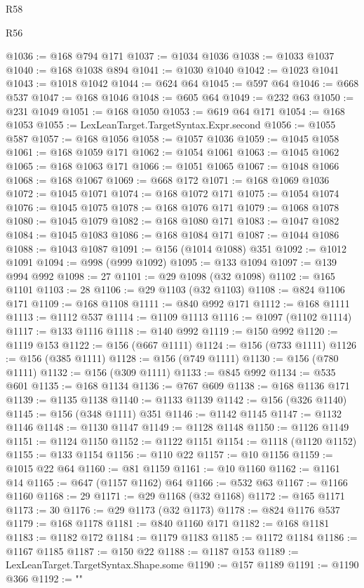 \begin{lexlean}{R58}
\begin{lexlean}{R56}
\begin{coremodule}
{{{{{{{{{{{{{{{{{{{{{{{{{{{{{{{{{{{{{{{{{{{{{{{{{{{{{{{{{{{{{{{{{{{{{{{{{{{{{{{{{{{{{{{{{{{{{{{{{{{{{{{{{{{{{{{{{{{{{{{{{{{{{{{{{{{{{{{{{{{{{{{{{{{{{{{{{{{{{{{{{{{{{{{{{{{{{{{{{{{{{{{{{{{{{{{{{{{{{{{{{{{{{{{{{{{@1036 := @168 @794 @171
@1037 := @1034 @1036
@1038 := @1033 @1037
@1040 := @168 @1038 @894
@1041 := @1030 @1040
@1042 := @1023 @1041
@1043 := @1018 @1042
@1044 := @624 @64
@1045 := @597 @64
@1046 := @668 @537
@1047 := @168 @1046
@1048 := @605 @64
@1049 := @232 @63
@1050 := @231 @1049
@1051 := @168 @1050
@1053 := @619 @64 @171
@1054 := @168 @1053
@1055 := LexLeanTarget.TargetSyntax.Expr.second
@1056 := @1055 @587
@1057 := @168 @1056
@1058 := @1057 @1036
@1059 := @1045 @1058
@1061 := @168 @1059 @171
@1062 := @1054 @1061
@1063 := @1045 @1062
@1065 := @168 @1063 @171
@1066 := @1051 @1065
@1067 := @1048 @1066
@1068 := @168 @1067
@1069 := @668 @172
@1071 := @168 @1069 @1036
@1072 := @1045 @1071
@1074 := @168 @1072 @171
@1075 := @1054 @1074
@1076 := @1045 @1075
@1078 := @168 @1076 @171
@1079 := @1068 @1078
@1080 := @1045 @1079
@1082 := @168 @1080 @171
@1083 := @1047 @1082
@1084 := @1045 @1083
@1086 := @168 @1084 @171
@1087 := @1044 @1086
@1088 := @1043 @1087
@1091 := @156 (@1014 @1088) @351
@1092 := @1012 @1091
@1094 := @998 (@999 @1092)
@1095 := @133 @1094
@1097 := @139 @994 @992
@1098 := 27
@1101 := @29 @1098 (@32 @1098)
@1102 := @165 @1101
@1103 := 28
@1106 := @29 @1103 (@32 @1103)
@1108 := @824 @1106 @171
@1109 := @168 @1108
@1111 := @840 @992 @171
@1112 := @168 @1111
@1113 := @1112 @537
@1114 := @1109 @1113
@1116 := @1097 (@1102 @1114)
@1117 := @133 @1116
@1118 := @140 @992
@1119 := @150 @992
@1120 := @1119 @153
@1122 := @156 (@667 @1111)
@1124 := @156 (@733 @1111)
@1126 := @156 (@385 @1111)
@1128 := @156 (@749 @1111)
@1130 := @156 (@780 @1111)
@1132 := @156 (@309 @1111)
@1133 := @845 @992
@1134 := @535 @601
@1135 := @168 @1134
@1136 := @767 @609
@1138 := @168 @1136 @171
@1139 := @1135 @1138
@1140 := @1133 @1139
@1142 := @156 (@326 @1140)
@1145 := @156 (@348 @1111) @351
@1146 := @1142 @1145
@1147 := @1132 @1146
@1148 := @1130 @1147
@1149 := @1128 @1148
@1150 := @1126 @1149
@1151 := @1124 @1150
@1152 := @1122 @1151
@1154 := @1118 (@1120 @1152)
@1155 := @133 @1154
@1156 := @110 @22
@1157 := @10 @1156
@1159 := @1015 @22 @64
@1160 := @81 @1159
@1161 := @10 @1160
@1162 := @1161 @14
@1165 := @647 (@1157 @1162) @64
@1166 := @532 @63
@1167 := @1166 @1160
@1168 := 29
@1171 := @29 @1168 (@32 @1168)
@1172 := @165 @1171
@1173 := 30
@1176 := @29 @1173 (@32 @1173)
@1178 := @824 @1176 @537
@1179 := @168 @1178
@1181 := @840 @1160 @171
@1182 := @168 @1181
@1183 := @1182 @172
@1184 := @1179 @1183
@1185 := @1172 @1184
@1186 := @1167 @1185
@1187 := @150 @22
@1188 := @1187 @153
@1189 := LexLeanTarget.TargetSyntax.Shape.some
@1190 := @157 @1189
@1191 := @1190 @366
@1192 := "{"
}}}}}}}}}}}}}}}}}}}}}}}}}}}}}}}}}}}}}}}}}}}}}}}}}}}}}}}}}}}}}}}}}}}}}}}}}}}}}}}}}}}}}}}}}}}}}}}}}}}}}}}}}}}}}}}}}}}}}}}}}}}}}}}}}}}}}}}}}}}}}}}}}}}}}}}}}}}}}}}}}}}}}}}}}}}}}}}}}}}}}}}}}}}}}}}}}}}}}}}}}}}}}}}}}}}}
\end{coremodule}
\end{lexlean}
\end{lexlean}
